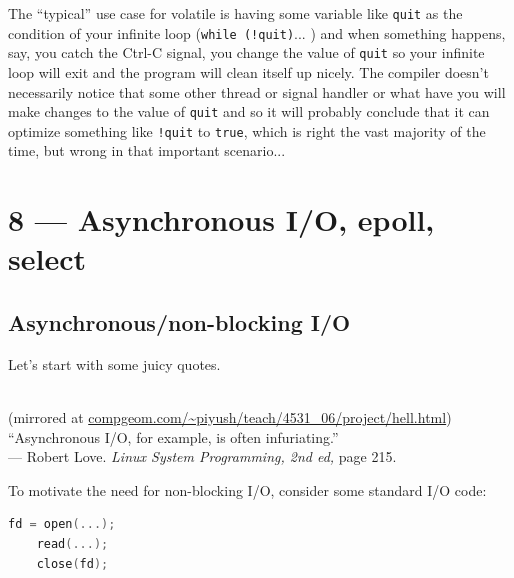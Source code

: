 \documentclass[a4paper]{report}
\begin{document}
The ``typical'' use case for volatile is having some variable like \texttt{quit} as the condition of your infinite loop (\texttt{while (!quit)}... ) and when something happens, say, you catch the Ctrl-C signal, you change the value of \texttt{quit} so your infinite loop will exit and the program will clean itself up nicely. The compiler doesn't necessarily notice that some other thread or signal handler or what have you will make changes to the value of \texttt{quit} and so it will probably conclude that it can optimize something like \texttt{!quit} to \texttt{true}, which is right the vast majority of the time, but wrong in that important scenario...

  








\chapter*{8 --- Asynchronous I/O, epoll, select}


\section*{Asynchronous/non-blocking I/O}

Let's start with some juicy quotes.

\begin{center}
  \\
{\scriptsize (mirrored at \url{compgeom.com/~piyush/teach/4531_06/project/hell.html})}
   \\[2em]

   ``Asynchronous I/O, for example, is often infuriating.''\\
\hfill --- Robert Love. {\em Linux System Programming, 2nd ed, } page 215.

\end{center}

To motivate the need for non-blocking I/O, consider some standard I/O code:

\begin{lstlisting}[language=C]
    fd = open(...);
    read(...);
    close(fd);
\end{lstlisting}
\end{document}
